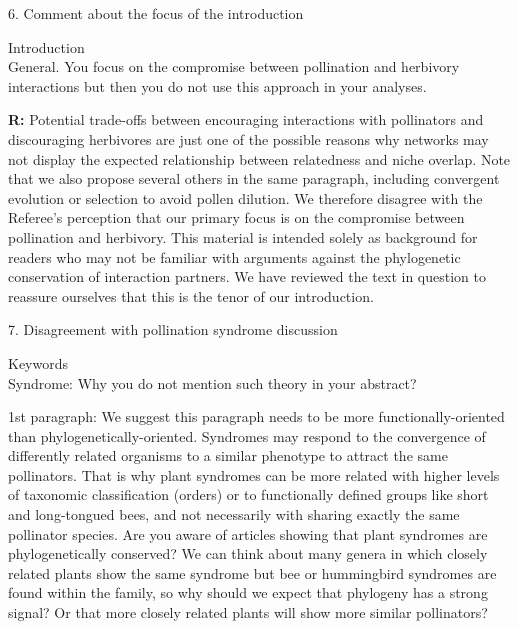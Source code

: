\documentclass[12pt]{letter}
\newenvironment{refquote}{\bigskip \begin{it}}{\end{it}\smallskip}
\begin{document}
	6. Comment about the focus of the introduction


		\begin{refquote}
		Introduction\\
		General. You focus on the compromise between pollination and herbivory interactions but then you do not use this approach in your analyses.
		\end{refquote}


		\textbf{R:} Potential trade-offs between encouraging interactions with pollinators and discouraging herbivores are just one of the possible reasons why networks may not display the expected relationship between relatedness and niche overlap. Note that we also propose several others in the same paragraph, including convergent evolution or selection to avoid pollen dilution. We therefore disagree with the Referee's perception that our primary focus is on the compromise between pollination and herbivory. This material is intended solely as background for readers who may not be familiar with arguments against the phylogenetic conservation of interaction partners. We have reviewed the text in question to reassure ourselves that this is the tenor of our introduction.


	7. Disagreement with pollination syndrome discussion

		\begin{refquote}
		Keywords\\
		Syndrome:  Why you do not mention such theory in your abstract?
		\end{refquote}


		\begin{refquote}
			1st paragraph: We suggest this paragraph needs to be more functionally-oriented than phylogenetically-oriented. Syndromes may respond to the convergence of differently related organisms to a similar phenotype to attract the same pollinators. That is why plant syndromes can be more related with higher levels of taxonomic classification (orders) or to functionally defined groups like short and long-tongued bees, and not necessarily with sharing exactly the same pollinator species. Are you aware of articles showing that plant syndromes are phylogenetically conserved? We can think about many genera in which closely related plants show the same syndrome but bee or hummingbird syndromes are found within the family, so why should we expect that phylogeny has a strong signal? Or that more closely related plants will show more similar pollinators?
		\end{refquote}
\end{document}
